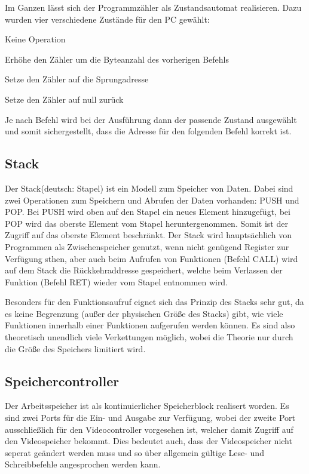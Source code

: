 Im Ganzen lässt sich der Programmzähler als Zustandsautomat realisieren. Dazu
wurden vier verschiedene Zustände für den \ac{PC} gewählt:

\begin{description}[align=right, labelwidth=1.6cm]
\item[NOP]		Keine Operation
\item[INC]		Erhöhe den Zähler um die Byteanzahl des vorherigen Befehls
\item[ASSIGN]	Setze den Zähler auf die Sprungadresse
\item[RESET]	Setze den Zähler auf null zurück
\end{description}

Je nach Befehl wird bei der Ausführung dann der passende Zustand ausgewählt und
somit sichergestellt, dass die Adresse für den folgenden Befehl korrekt ist.
\pagebreak
\subsection{Stack}
\label{s:stack}
Der Stack(deutsch: Stapel) ist ein Modell zum Speicher von Daten. Dabei sind
zwei Operationen zum Speichern und Abrufen der Daten vorhanden: PUSH und POP\@.
Bei PUSH wird oben auf den Stapel ein neues Element hinzugefügt, bei POP wird
das oberste Element vom Stapel heruntergenommen. Somit ist der Zugriff auf das
oberste Element beschränkt. Der Stack wird hauptsächlich von Programmen als
Zwischenspeicher genutzt, wenn nicht genügend Register zur Verfügung sthen, aber
auch beim Aufrufen von Funktionen (Befehl CALL) wird auf dem Stack die Rückkehraddresse
gespeichert, welche beim Verlassen der Funktion (Befehl RET) wieder
vom Stapel entnommen wird.

Besonders für den Funktionsaufruf eignet sich das Prinzip des Stacks sehr gut,
da es keine Begrenzung (außer der physischen Größe des Stacks) gibt, wie viele
Funktionen innerhalb einer Funktionen aufgerufen werden können. Es sind also
theoretisch unendlich viele Verkettungen möglich, wobei die Theorie nur durch
die Größe des Speichers limitiert wird.
\subsection{Speichercontroller}
\label{s:memorycontrol}
Der Arbeitsspeicher ist als kontinuierlicher Speicherblock realisert worden. Es
sind zwei Ports für die Ein- und Ausgabe zur Verfügung, wobei der zweite Port
ausschließlich für den Videocontroller vorgesehen ist, welcher damit Zugriff auf
den Videospeicher bekommt. Dies bedeutet auch, dass der Videospeicher nicht
seperat geändert werden muss und so über allgemein gültige Lese- und
Schreibbefehle angesprochen werden kann.

